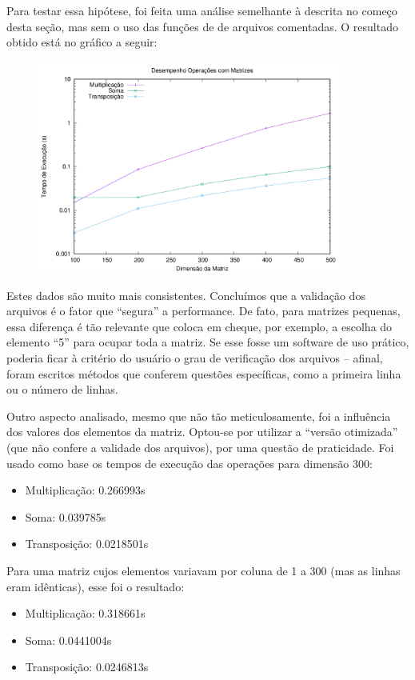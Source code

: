 \documentclass{article}
\begin{document}
Para testar essa hipótese, foi feita uma análise semelhante à descrita no começo desta seção, mas sem o uso das funções de de arquivos comentadas. O resultado obtido está no gráfico a seguir: 

\begin{figure} [H]
    \includegraphics[width=10cm]{opt-params-perf.png} 
    \centering
\end{figure}

Estes dados são muito mais consistentes. Concluímos que a validação dos arquivos é o fator que ``segura'' a performance. De fato, para matrizes pequenas, essa diferença é tão relevante que coloca em cheque, por exemplo, a escolha do elemento ``5'' para ocupar toda a matriz. Se esse fosse um software de uso prático, poderia ficar à critério do usuário o grau de verificação dos arquivos -- afinal, foram escritos métodos que conferem questões específicas, como a primeira linha ou o número de linhas.

Outro aspecto analisado, mesmo que não tão meticulosamente, foi a influência dos valores dos elementos da matriz. Optou-se por utilizar a ``versão otimizada'' (que não confere a validade dos arquivos), por uma questão de praticidade. Foi usado como base os tempos de execução das operações para dimensão 300:

\begin{itemize}
    \item Multiplicação: 0.266993s
    \item Soma: 0.039785s
    \item Transposição: 0.0218501s
\end{itemize}

Para uma matriz cujos elementos variavam por coluna de 1 a 300 (mas as linhas eram idênticas), esse foi o resultado:

\begin{itemize}
    \item Multiplicação: 0.318661s
    \item Soma: 0.0441004s
    \item Transposição: 0.0246813s
\end{itemize}
\end{document}
